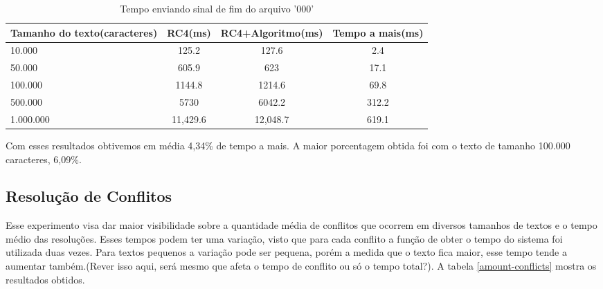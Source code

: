 \begin{description}
\begin{table}[h]
\centering
\begin{tabular}{|p{3cm}|c|c|c|}
\hline
Tamanho do texto(caracteres) & RC4(ms)  & RC4+Algoritmo(ms) & Tempo a mais(ms) \\ \hline
10.000                       & 125.2    & 127.6             & 2.4              \\ \hline
50.000                       & 605.9    & 623               & 17.1             \\ \hline
100.000                      & 1144.8   & 1214.6            & 69.8             \\ \hline
500.000                      & 5730     & 6042.2            & 312.2            \\ \hline
1.000.000                    & 11,429.6 & 12,048.7          & 619.1            \\ \hline
\end{tabular}
\caption{Tempo enviando sinal de fim do arquivo '000'}
\end{table}
\end{description}

Com esses resultados obtivemos em média 4,34\% de tempo a mais. A maior porcentagem obtida foi com o texto de tamanho 100.000 caracteres, 6,09\%.

\subsection{Resolução de Conflitos}

Esse experimento visa dar maior visibilidade sobre a quantidade média de conflitos que ocorrem em diversos tamanhos de textos e o tempo médio das resoluções. Esses tempos podem ter uma variação, visto que para cada conflito a função de obter o tempo do sistema foi utilizada duas vezes. Para textos pequenos a variação pode ser pequena, porém a medida que o texto fica maior, esse tempo tende a aumentar também.(Rever isso aqui, será mesmo que afeta o tempo de conflito ou só o tempo total?). A tabela \ref{amount-conflicts} mostra os resultados obtidos.

